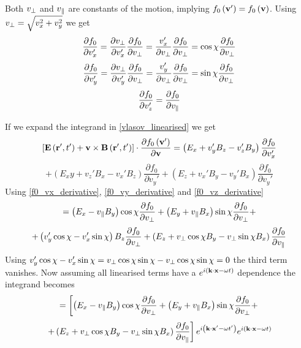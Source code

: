 Both $v_\perp$ and $v_\parallel$ are constants of the motion, implying $f_0\left(\textbf{v}'\right) = f_0\left(\textbf{v}\right)$. Using $v_\perp = \sqrt{v_x^2+v_y^2}$ we get
\begin{equation}\label{f0_vx_derivative}
	\frac{\partial f_0}{\partial v_x'}=\frac{\partial v_\perp}{\partial v_x '}\frac{\partial f_0}{\partial v_\perp} = \frac{v_x'}{\partial v_\perp}\frac{\partial f_0}{\partial v_\perp} = \cos\chi \frac{\partial f_0}{\partial v_\perp}
\end{equation}
\begin{equation}\label{f0_vy_derivative}
	\frac{\partial f_0}{\partial v_y'}=\frac{\partial v_\perp}{\partial v_y '}\frac{\partial f_0}{\partial v_\perp} = \frac{v_y'}{\partial v_\perp}\frac{\partial f_0}{\partial v_\perp} = \sin\chi \frac{\partial f_0}{\partial v_\perp}
\end{equation}
\begin{equation}\label{f0_vz_derivative}
	\frac{\partial f_0}{\partial v_z '} = \frac{\partial f_0}{\partial v_\parallel}
\end{equation}

If we expand the integrand in \eqref{vlasov_linearised} we get
\begin{equation*}
	\left[ \textbf{E} \left(\textbf{r}', t'\right) + \textbf{v} \times \textbf{B}\left(\textbf{r}', t'\right) \right] \cdot \frac{\partial f_0 \left(\textbf{v}'\right)}{\partial \textbf{v}} = \left(E_x+v_y'B_z-v_z'B_y\right) \frac{\partial f_0}{\partial v_x'}
\end{equation*}
\begin{equation}
	+ \left(E_xy+v_z'B_x-v_x'B_z\right) \frac{\partial f_0}{\partial v_y'} + \left(E_z+v_x'B_y-v_y'B_x\right) \frac{\partial f_0}{\partial v_y'}
\end{equation}
Using \eqref{f0_vx_derivative}, \eqref{f0_vy_derivative} and \eqref{f0_vz_derivative}
\begin{equation*}
	= \left(E_x-v_\parallel B_y\right) \cos\chi\frac{\partial f_0}{\partial v_\perp} + \left(E_y+v_\parallel B_x\right) \sin\chi\frac{\partial f_0}{\partial v_\perp} + 
\end{equation*}
\begin{equation}
	+ \left(v_y'\cos\chi - v_x' \sin\chi\right)B_z \frac{\partial f_0}{\partial v_\perp} + \left(E_z + v_\perp \cos\chi B_y - v_\perp \sin\chi B_x\right)\frac{\partial f_0}{\partial v_\parallel}
\end{equation}
Using $v_y'\cos\chi - v_x' \sin\chi = v_\perp \cos \chi \sin \chi - v_\perp \cos \chi \sin \chi = 0$ the third term vanishes. Now assuming all linearised terms have a $e^{i\left(\textbf{k}\cdot\textbf{x}-\omega t\right)}$ dependence the integrand becomes
\begin{equation*}
	= \left[\left(E_x-v_\parallel B_y\right) \cos\chi\frac{\partial f_0}{\partial v_\perp} + \left(E_y+v_\parallel B_x\right) \sin\chi\frac{\partial f_0}{\partial v_\perp} + \right.
\end{equation*}
\begin{equation}\label{vlasov_linearised2}
	\left. + \left(E_z + v_\perp \cos\chi B_y - v_\perp \sin\chi B_x\right)\frac{\partial f_0}{\partial v_\parallel}\right] e^{i\left(\textbf{k}\cdot\textbf{x}'-\omega t'\right)} e^{i\left(\textbf{k}\cdot\textbf{x}-\omega t\right)}
\end{equation}

